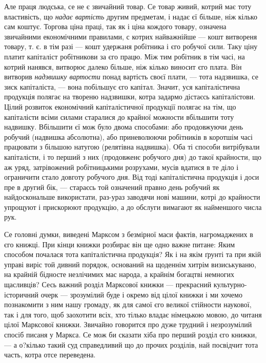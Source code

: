 Але праця людська, се не є звичайний товар. Се товар живий, котрий має тоту властивість, що \emph{надає вартість} другим предметам, і надає єї більше, ніж кілько сам коштує. Торгова ціна праці, так як і ціна кождого товару, означена звичайними економічними правилами, с котрих найважнійше — кошт витвореня товару, т. є. в тім разі — кошт удержаня робітника і єго робучої сили. Таку ціну платит капіталіст робітникови за єго працю. Між тим робітник в тім часі, на котрий нанявся, витворює далеко більше, ніж кілько виносит єго плата. Він витворив \emph{надзвишку вартости} понад вартість своєї плати, — тота надзвишка, се зиск капіталіста, — вона побільшує єго капітал. Значит, уся капіталістична продукція полягає на твореню надзвишки, котра задармо дістаєсь капіталістови. Цілий розвиток економічний капіталістичної продукції полягає на тім, що капіталісти всіми силами старалися до крайної можности вбільшити тоту надвишку. Вбільшити єї мож було двома способами: або продовжуючи день робучий (надвишка абсолютна), або приневолюючи робітників в коротшім часі працювати з більшою натугою (релятівна надвишка). Оба ті способи витрібували капіталісти, і то перший з них (продовженє робучого дня) до такої крайности, що аж уряд, затрівожений робітницькими розрухами, мусів вдатися в те діло і ограничити стало довготу робучого дня. Від тоді капіталістична продукція і доси пре в другий бік, — стараєсь той означений правно день робучий як найдоскональше використати, раз-ураз заводячи нові машини, котрі до крайности упрощуют і прискорюют продукцію, а до обслуги вимагают як найменшого числа рук.

Се головні думки, виведені Марксом з безмірної маси фактів, нагромаджених в єго книжці. При кінци книжки розбирає він ще одно важне питане: Яким способом почалася тота капіталістична продукція? Як і на якім ґрунті та при якій управі виріс той дивний порядок, оснований на щоденнім хитрім визиськуваню, на крайній бідносте незлічимих мас народа, а крайнім богацтві немногих щасливців? Сесь важний розділ Марксової книжки — прекрасний культурно-історичний очерк — зрозумілий буде і окремо від цілої книжки і ми хочемо познакомити з ним нашу громаду, як для самої єго великої стійности наукової, так і для того, щоб заохотити всіх, хто тілько владає німецькою мовою, до читаня цілої Марксової книжки. Звичайно говорится про дуже трудний і незрозумілий спосіб писаня у Маркса. Се мож би сказати хіба про перший розділ єго книжки, — а о?кілько такий суд справедливий що до прочих розділів, най посвідчит тота часть, котра отсе переведена.